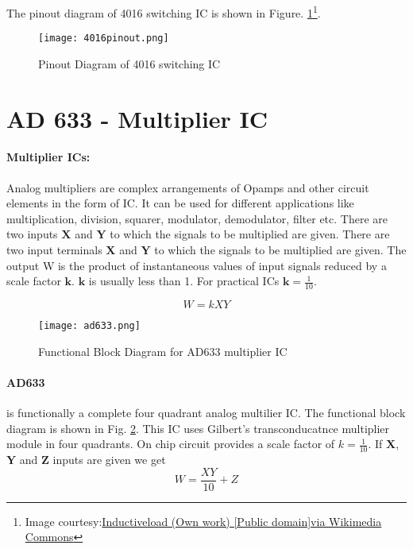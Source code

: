 The pinout diagram of 4016 switching IC is shown in Figure. \ref{4016pin}\footnote{Image courtesy:\href{http://commons.wikimedia.org/wiki/File\%3A4016\_Pinout.svg}{Inductiveload (Own work) [Public domain]via Wikimedia Commons}}.
\begin{figure}
\texttt{[image: 4016pinout.png]}
\caption{Pinout Diagram of 4016 switching IC}
\label{4016pin}
\end{figure} 

\section{AD 633 - Multiplier IC}
\label{AD633}
\paragraph{Multiplier ICs:}
 Analog multipliers are complex arrangements of Opamps and other circuit elements in the form of IC. It can be used for different applications like multiplication, division, squarer, modulator, demodulator, filter etc. There are two inputs $\textbf{X}$ and $\textbf{Y}$ to which the signals to be multiplied are given.
There are two input terminals $\textbf{X}$ and $\textbf{Y}$ to which the signals to be multiplied are given. The output W is the product of instantaneous values of input signals reduced by a scale factor $\textbf{k}$. $\textbf{k}$ is usually less than 1. For practical ICs $\textbf{k}=\frac{1}{10}$.

\begin{equation}
W=kXY
\end{equation}

\begin{figure}[h]
\texttt{[image: ad633.png]}
\caption{Functional Block Diagram for AD633 multiplier IC}
\label{ad633}
\end{figure}

\paragraph{AD633} is functionally a complete four quadrant analog multilier IC. The functional block diagram is shown in Fig. \ref{ad633}. This IC uses Gilbert's transconducatnce multiplier module in four quadrants. On chip circuit provides a scale factor of $k=\frac{1}{10}$. If $\textbf{X}$, $\textbf{Y}$ and $\textbf{Z}$ inputs are given we get 
\begin{equation}
W=\frac{XY}{10}+Z
\end{equation}

